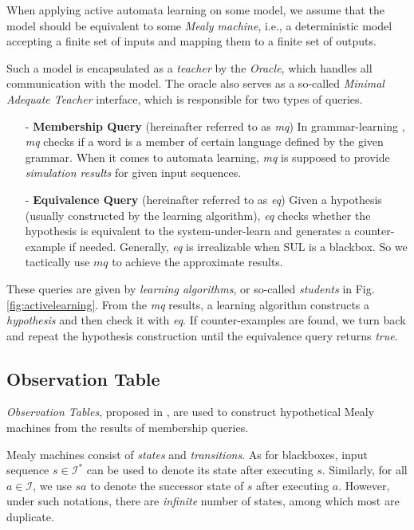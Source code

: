 \documentclass[conference, a4paper]{IEEEtran}
\begin{document}
When applying active automata learning on some model, we assume that the model should be equivalent
to some \emph{Mealy machine}, i.e., a deterministic model accepting a finite set of inputs and
mapping them to a finite set of outputs.

Such a model is encapsulated as a \emph{teacher} by the \emph{Oracle}, which handles
all communication with the model. The oracle also serves as a so-called \emph{Minimal Adequate
Teacher} \cite{DBLP:journals/iandc/Angluin87}
interface, which is responsible for two types of queries.

\begin{itemize}
  \item[-] \textbf{Membership Query} (hereinafter referred to as \emph{mq}) In grammar-learning
    \cite{DBLP:journals/iandc/Angluin87}, \emph{mq} checks if a word is a member of certain language
    defined by the given grammar. When it comes to
    automata learning, \emph{mq} is supposed to provide \emph{simulation results} for given input
    sequences.
  \item[-] \textbf{Equivalence Query} (hereinafter referred to as \emph{eq}) Given a hypothesis
    (usually constructed by the learning algorithm), \emph{eq} checks whether the hypothesis is
    equivalent to the system-under-learn and generates a counter-example if needed. Generally,
    \emph{eq} is irrealizable when SUL is a blackbox. So we tactically use $mq$ to achieve the
    approximate results.
\end{itemize}

These queries are given by \emph{learning algorithms}, or so-called \emph{students} in Fig.
\ref{fig:activelearning}. From the \emph{mq} results, a learning algorithm constructs a
\emph{hypothesis} and then check it with \emph{eq}. If counter-examples are found, we turn back and
repeat the hypothesis construction until the equivalence query returns \emph{true}.



\subsection{Observation Table}
\emph{Observation Tables}, proposed in \cite{DBLP:journals/iandc/Angluin87}, are used to construct
hypothetical Mealy machines from the results of membership queries.

Mealy machines consist of \emph{states} and \emph{transitions}.
As for blackboxes, input sequence $s\in\mathcal{I}^*$ can be used to denote its state 
after executing $s$. Similarly, for all $a\in\mathcal{I}$, we use $sa$ to denote the successor
state of $s$ after executing $a$.
However, under such notations, there are \emph{infinite} number of states, among which most are
duplicate.
\end{document}
